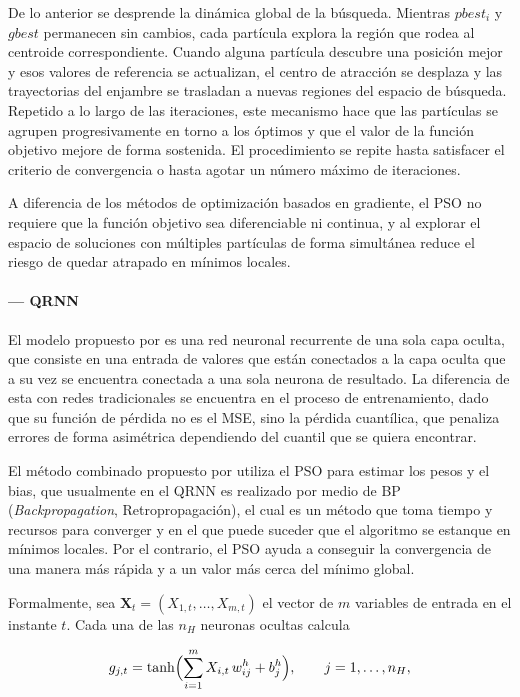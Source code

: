 \documentclass[12pt]{paper}
\begin{document}
De lo anterior se desprende la dinámica global de la búsqueda. Mientras $pbest_i$ y $gbest$ permanecen sin cambios, cada partícula explora la región que rodea al centroide correspondiente. Cuando alguna partícula descubre una posición mejor y esos valores de referencia se actualizan, el centro de atracción se desplaza y las trayectorias del enjambre se trasladan a nuevas regiones del espacio de búsqueda. Repetido a lo largo de las iteraciones, este mecanismo hace que las partículas se agrupen progresivamente en torno a los óptimos y que el valor de la función objetivo mejore de forma sostenida. El procedimiento se repite hasta satisfacer el criterio de convergencia o hasta agotar un número máximo de iteraciones.

A diferencia de los métodos de optimización basados en gradiente, el PSO no requiere que la función objetivo sea diferenciable ni continua, y al explorar el espacio de soluciones con múltiples partículas de forma simultánea reduce el riesgo de quedar atrapado en mínimos locales.

\paragraph{--- QRNN}
El modelo propuesto por \cite{taylor2000qrnn} es una red neuronal recurrente de una sola capa oculta, que consiste en una entrada de valores que están conectados a la capa oculta que a su vez se encuentra conectada a una sola neurona de resultado. La diferencia de esta con redes tradicionales se encuentra en el proceso de entrenamiento, dado que su función de pérdida no es el MSE, sino la pérdida cuantílica, que penaliza errores de forma asimétrica dependiendo del cuantil que se quiera encontrar.

El método combinado propuesto por \cite{pradeepkumar2017forecasting} utiliza el PSO para estimar los pesos y el bias, que usualmente en el QRNN es realizado por medio de BP (\textit{Backpropagation}, Retropropagación), el cual es un método que toma tiempo y recursos para converger y en el que puede suceder que el algoritmo se estanque en mínimos locales. Por el contrario, el PSO ayuda a conseguir la convergencia de una manera más rápida y a un valor más cerca del mínimo global.

Formalmente, sea $\mathbf{X}_t = (X_{1,t}, \ldots, X_{m,t})$ el vector de $m$ variables de entrada en el instante $t$. Cada una de las $n_H$ neuronas ocultas calcula

\begin{equation}
    g_{j,t} = \tanh\Bigl(\sum_{i=1}^{m} X_{i,t}\,w_{ij}^{h} + b_j^{h}\Bigr), \qquad j = 1,\ldots,n_H,
\end{equation}
\end{document}
